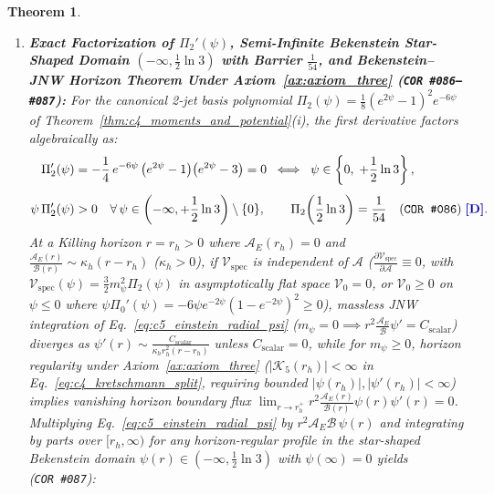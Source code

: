 \documentclass[11pt,a4paper]{article}
\newcommand{\catD}{\text{\textbf{\textcolor{blue!75!black}{[D]}}}}
\theoremstyle{definition}
\theoremstyle{plain}
\newtheorem{theorem}[axiom]{Theorem}
\theoremstyle{remark}
\begin{document}
\begin{theorem}
\begin{enumerate}[label=(\alph*)]
\begin{align}
  \frac{d}{dr}\ln\!\left[\mathcal{A}_E(r)\mathcal{B}(r)\right] = \frac{\mathcal{A}_E'}{\mathcal{A}_E} + \frac{\mathcal{B}'}{\mathcal{B}} &= \frac{3}{4}\,r\left[\psi'(r)\right]^2 + r\,\mathcal{B}(r)^2\,\mathcal{A}\,\frac{\partial\mathcal{V}_{\mathrm{spec}}(\psi, \mathcal{A})}{\partial\mathcal{A}} \;\;\catD. \label{eq:c5_einstein_focusing}
  \end{align}
  \item \textbf{Exact Factorization of $\Pi_2'(\psi)$, Semi-Infinite Bekenstein Star-Shaped Domain $(-\infty, \frac{1}{2}\ln 3)$ with Barrier $\frac{1}{54}$, and Bekenstein--JNW Horizon Theorem Under Axiom~\ref{ax:axiom_three} (\texttt{COR~\#086--\#087}):}
  For the canonical 2-jet basis polynomial $\Pi_2(\psi) = \frac{1}{8}(e^{2\psi} - 1)^2 e^{-6\psi}$ of Theorem~\ref{thm:c4_moments_and_potential}(i), the first derivative factors algebraically as:
  \begin{align}
  \Pi_2'(\psi) &= -\frac{1}{4}\,e^{-6\psi}\left(e^{2\psi} - 1\right)\!\left(e^{2\psi} - 3\right) = 0 \;\;\Longleftrightarrow\;\; \psi \in \left\{0,\; +\frac{1}{2}\ln 3\right\}, \nonumber \\[4pt]
  \psi\,\Pi_2'(\psi) &> 0 \quad \forall\,\psi \in \left(-\infty, +\frac{1}{2}\ln 3\right) \setminus \{0\}, \qquad
  \Pi_2\!\left(\frac{1}{2}\ln 3\right) = \frac{1}{54} \quad \textnormal{(\texttt{COR~\#086})} \;\catD. \label{eq:c5_pi2_derivative_factorization}
  \end{align}
  At a Killing horizon $r = r_h > 0$ where $\mathcal{A}_E(r_h) = 0$ and $\frac{\mathcal{A}_E(r)}{\mathcal{B}(r)} \sim \kappa_h(r - r_h)$ ($\kappa_h > 0$), if $\mathcal{V}_{\mathrm{spec}}$ is independent of $\mathcal{A}$ ($\frac{\partial\mathcal{V}_{\mathrm{spec}}}{\partial\mathcal{A}} \equiv 0$, with $\mathcal{V}_{\mathrm{spec}}(\psi) = \frac{3}{2}m_\psi^2\Pi_2(\psi)$ in asymptotically flat space $\mathcal{V}_0 = 0$, or $\mathcal{V}_0 \ge 0$ on $\psi \le 0$ where $\psi\Pi_0'(\psi) = -6\psi e^{-2\psi}(1-e^{-2\psi})^2 \ge 0$), massless JNW integration of Eq.~\eqref{eq:c5_einstein_radial_psi} ($m_\psi = 0 \implies r^2\frac{\mathcal{A}_E}{\mathcal{B}}\psi' = C_{\mathrm{scalar}}$) diverges as $\psi'(r) \sim \frac{C_{\mathrm{scalar}}}{\kappa_h r_h^2(r - r_h)}$ unless $C_{\mathrm{scalar}} = 0$, while for $m_\psi \ge 0$, horizon regularity under Axiom~\ref{ax:axiom_three} ($|\mathcal{K}_5(r_h)| < \infty$ in Eq.~\eqref{eq:c4_kretschmann_split}, requiring bounded $|\psi(r_h)|, |\psi'(r_h)| < \infty$) implies vanishing horizon boundary flux $\lim_{r\to r_h^+} r^2\frac{\mathcal{A}_E(r)}{\mathcal{B}(r)}\psi(r)\psi'(r) = 0$. Multiplying Eq.~\eqref{eq:c5_einstein_radial_psi} by $r^2\mathcal{A}_E\mathcal{B}\,\psi(r)$ and integrating by parts over $[r_h, \infty)$ for any horizon-regular profile in the star-shaped Bekenstein domain $\psi(r) \in (-\infty, \frac{1}{2}\ln 3)$ with $\psi(\infty) = 0$ yields (\texttt{COR~\#087}):

\end{enumerate}
\end{theorem}
\end{document}
